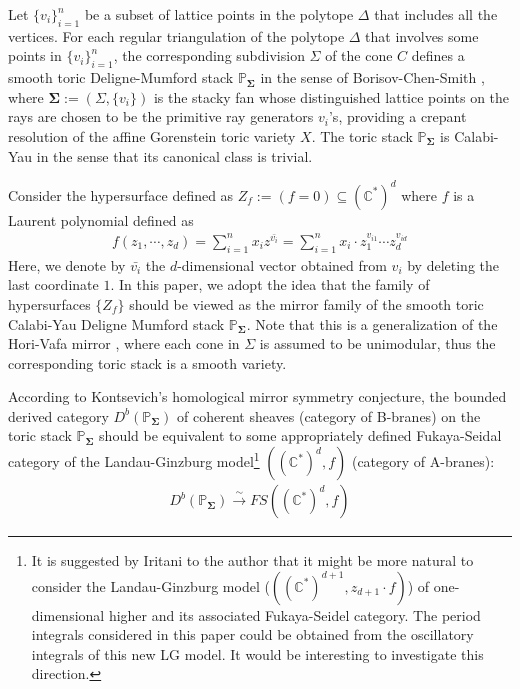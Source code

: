 \documentclass[11pt,reqno]{amsart}
\def\C {{\mathbb C}}
\def\CC {{\mathbb C}}
\def\PP {{\mathbb P}}
\theoremstyle{definition}
\numberwithin{equation}{section}
\begin{document}
\smallskip

Let $\{v_i\}_{i=1}^n$ be a subset of lattice points in the polytope $\Delta$ that includes all the vertices. For each regular triangulation of the polytope $\Delta$ that involves some points in $\{v_i\}_{i=1}^n$, the corresponding subdivision $\Sigma$ of the cone $C$ defines a smooth toric Deligne-Mumford stack $\PP_{\mathbf{\Sigma}}$ in the sense of Borisov-Chen-Smith \cite{BCS}, where $\mathbf{\Sigma}:=(\Sigma,\{v_i\})$ is the stacky fan whose distinguished lattice points on the rays are chosen to be the primitive ray generators $v_i$'s, providing a crepant resolution of the affine Gorenstein toric variety $X$. The toric stack $\PP_{\mathbf{\Sigma}}$ is Calabi-Yau in the sense that its canonical class is trivial. 

\smallskip

Consider the hypersurface defined as $Z_f:=(f=0)\subseteq (\CC^*)^d$ where $f$ is a Laurent polynomial defined as
\begin{align*}
	f(z_1,\cdots,z_d)=\sum_{i=1}^n x_i z^{\bar{v_i}}=\sum_{i=1}^n x_i\cdot z_1^{v_{i1}}\cdots z_d^{v_{id}}
\end{align*}
Here, we denote by $\bar{v_i}$ the $d$-dimensional vector obtained from $v_i$ by deleting the last coordinate $1$. In this paper, we adopt the idea that the family of hypersurfaces $\{Z_f\}$ should be viewed as the mirror family of the smooth toric Calabi-Yau Deligne Mumford stack $\PP_{\mathbf{\Sigma}}$. Note that this is a generalization of the Hori-Vafa mirror \cite{Hori-Vafa}, where each cone in $\Sigma$ is assumed to be unimodular, thus the corresponding toric stack is a smooth variety.

\smallskip

According to Kontsevich's homological mirror symmetry conjecture, the bounded derived category $D^b(\PP_{\mathbf{\Sigma}})$ of coherent sheaves (category of B-branes) on the toric stack $\PP_{\mathbf{\Sigma}}$ should be equivalent to some appropriately defined Fukaya-Seidal category of the Landau-Ginzburg model\footnote{It is suggested by Iritani to the author that it might be more natural to consider the Landau-Ginzburg model ($((\C^*)^{d+1},z_{d+1}\cdot f)$) of one-dimensional higher and its associated Fukaya-Seidel category. The period integrals considered in this paper could be obtained from the oscillatory integrals of this new LG model. It would be interesting to investigate this direction.} $((\C^*)^d,f)$ (category of A-branes):
\begin{align}\label{HMS}
	D^b(\PP_{\mathbf{\Sigma}})\xrightarrow{\sim} FS((\C^*)^d,f)
\end{align}
\end{document}
